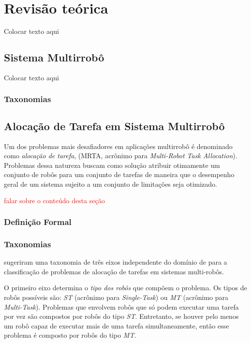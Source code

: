 \chapter[Revisão teórica]{Revisão teórica} \label{cap:cap1}
    Colocar texto aqui 
    
    \section{Sistema Multirrobô} \label{sec:mrs}
        Colocar texto aqui
    
        \subsection{Taxonomias} \label{subsec:taxonomias_mrs}
    
    \section{Alocação de Tarefa em Sistema Multirrobô} \label{sec:mrta}
        Um dos problemas mais desafiadores em aplicações multirrobô é denominado como \textit{alocação de tarefa}, (MRTA, acrônimo para \textit{Multi-Robot Task Allocation}). Problemas dessa natureza buscam como solução atribuir otimamente um conjunto de robôs para um conjunto de tarefas de maneira que o desempenho geral de um sistema sujeito a um conjunto de limitações seja otimizado.
        
        \textcolor{red}{falar sobre o conteúdo desta seção}
        
        
        \subsection{Definição Formal} \label{subsec:mrta_formal}
    
        \subsection{Taxonomias} \label{subsec:taxonomia_mrta}
             sugeriram uma taxonomia de três eixos independente do domínio de para a classificação de problemas de alocação de tarefas em sistemas multi-robôs. 
            
            O primeiro eixo determina o \textit{tipo dos robôs} que compõem o problema. Os tipos de robôs possíveis são: \textit{ST} (acrônimo para \textit{Single-Task}) ou \textit{MT} (acrônimo para \textit{Multi-Task}). Problemas que envolvem robôs que só podem executar uma tarefa por vez são compostos por robôs do tipo \textit{ST}. Entretanto, se houver pelo menos um robô capaz de executar mais de uma tarefa simultaneamente, então esse problema é composto por robôs do tipo \textit{MT}. 
            
